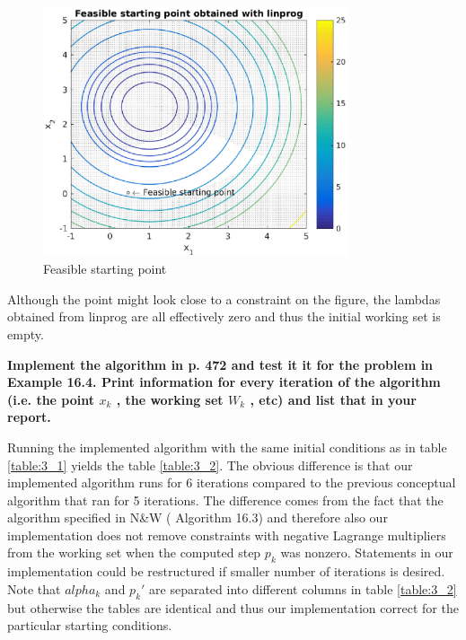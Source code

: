 \begin{figure}
    \centering
    \includegraphics[width = 0.8\textwidth]{fig_3_3.eps}
    \caption{Feasible starting point}
    \label{fig:3_3}
\end{figure}

Although the point might look close to a constraint on the figure, the lambdas obtained from linprog are all effectively zero and thus the initial working set is empty.

\textbf{Implement the algorithm in p. 472 and test it it for the problem in Example 16.4. Print information for every iteration of the algorithm (i.e. the point $x_k$ , the working set $W_k$ , etc) and list that in your report.}

Running the implemented algorithm with the same initial conditions as in table \ref{table:3_1} yields the table \ref{table:3_2}. The obvious difference is that our implemented algorithm runs for 6 iterations compared to the previous conceptual algorithm that ran for 5 iterations. The difference comes from the fact that the algorithm specified in N\&W ( Algorithm 16.3) and therefore also our implementation does not remove constraints with negative Lagrange multipliers from the working set when the computed step $p_k$ was nonzero. Statements in our implementation could be restructured if smaller number of iterations is desired. Note that $alpha_k$ and $p_k'$ are separated into different columns in table \ref{table:3_2} but otherwise the tables are identical and thus our implementation correct for the particular starting conditions.



